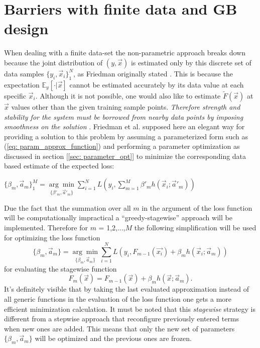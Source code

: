 \documentclass[12pt, a4paper]{article}
\begin{document}
\section{Barriers with finite data and GB design}
When dealing with a finite data-set the non-parametric approach breaks down because the joint distribution of $(y,\vec{x})$ is estimated only by this discrete set of data samples $\{y_i,\vec{x}_i\}_1^N$, as Friedman originally stated \cite{Friedman2001}. This is because the expectation $\mathbb{E}_y[\cdot|\vec{x}]$ cannot be estimated accurately by its data value at each specific $\vec{x}_i$. Although it is not possible, one would also like to estimate $\tilde{F}(\vec{x})$ at $\vec{x}$ values other than the given training sample points. \textit{Therefore strength and stability for the system must be borrowed from nearby data points by imposing smoothness on the solution} \cite{Friedman2001}.
Friedman et al. supposed here an elegant way for providing a solution to this problem by assuming a parameterized form such as (\ref{eq: param_approx_function}) and performing a parameter optimization as discussed in section [\ref{sec: parameter_opt}] to minimize the corresponding data based estimate of the expected loss:
\begin{center}
    $\{\beta_m,\vec{a}_m\}_1^M = \underset{ \{\beta'_m,\vec{a}'_m \} }{\arg\min}
    \sum_{i=1}^N L
    \left(y_i,\sum_{m=1}^M\beta'_{m} h(\vec{x}_i;\vec{a}'_m)\right)$
\end{center}
Due the fact that the summation over all $m$ in the argument of the loss function will be computationally impractical a ``greedy-stagewise'' approach will be implemented. Therefore for $m$ = 1,2,...,$M$ the following simplification will be used for optimizing the loss function
\begin{equation}
    \label{eq: greedy_stagewise}
        \{\beta_m,\vec{a}_m\} = \underset{ \{\beta_m,\vec{a}_m \} }{\arg\min}
    \sum_{i=1}^N L
    (y_i,F_{m-1}(\vec{x_i}) + \beta_m h(\vec{x}_i;\vec{a}_m))
\end{equation}
for evaluating the stagewise function
\begin{equation}
    F_m(\vec{x}) = F_{m-1}(\vec{x}) + \beta_m h(\vec{x};\vec{a}_m).
\end{equation}
It's definitely visible that by taking the last evaluated approximation instead of all generic functions in the evaluation of the loss function one gets a more efficient minimization calculation.
It must be noted that this \textit{stagewise} strategy is different from a stepwise approach that reconfigure previously entered terms when new ones are added. This means that only the new set of parameters $\{\beta_m,\vec{a}_m\}$ will be optimized and the previous ones are frozen.
\end{document}
